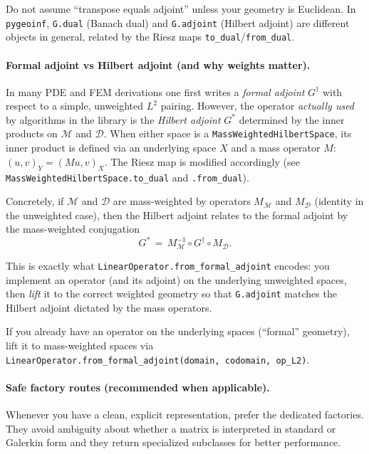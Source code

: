 \documentclass[11pt,twoside,openright]{book}
\theoremstyle{plain}
\theoremstyle{definition}
\theoremstyle{remark}
\newcommand{\modelspace}{\mathcal{M}}
\newcommand{\dataspace}{\mathcal{D}}
\newcommand{\ip}[3]{(#1,#2)_{#3}}         %
\begin{document}
\begin{pitfallbox}
Do not assume ``transpose equals adjoint'' unless your geometry is Euclidean.
In \texttt{pygeoinf}, \texttt{G.dual} (Banach dual) and \texttt{G.adjoint}
(Hilbert adjoint) are different objects in general, related by the Riesz maps
\texttt{to\_dual}/\texttt{from\_dual}.
\end{pitfallbox}

\paragraph{Formal adjoint vs Hilbert adjoint (and why weights matter).}
In many PDE and FEM derivations one first writes a \emph{formal adjoint}
$G^{\dagger}$ with respect to a simple, unweighted $L^2$ pairing. However, the
operator \emph{actually used} by algorithms in the library is the \emph{Hilbert
adjoint} $G^*$ determined by the inner products on $\modelspace$ and
$\dataspace$.
When either space is a \texttt{MassWeightedHilbertSpace}, its inner
product is defined via an underlying space $X$ and a mass operator $M$:
\(\ip{u}{v}{Y}=\ip{M u}{v}{X}\). The Riesz map is modified accordingly (see
\texttt{MassWeightedHilbertSpace.to\_dual} and \texttt{.from\_dual}).

Concretely, if $\modelspace$ and $\dataspace$ are mass-weighted by operators
$M_{\modelspace}$ and $M_{\dataspace}$ (identity in the unweighted case), then
the Hilbert adjoint relates to the formal adjoint by the mass-weighted
conjugation
\begin{equation}
  \label{eq:formal-vs-hilbert-adjoint}
  G^* \,=\, M_{\modelspace}^{-1} \circ G^{\dagger} \circ M_{\dataspace}.
\end{equation}

This is exactly what \texttt{LinearOperator.from\_formal\_adjoint} encodes: you
implement an operator (and its adjoint) on the underlying unweighted spaces,
then \emph{lift} it to the correct weighted geometry so that
\texttt{G.adjoint} matches the Hilbert adjoint dictated by the mass operators.

\begin{codebox}
If you already have an operator on the underlying spaces (``formal'' geometry),
lift it to mass-weighted spaces via
\texttt{LinearOperator.from\_formal\_adjoint(domain, codomain, op\_L2)}.
\end{codebox}

\paragraph{Safe factory routes (recommended when applicable).}
Whenever you have a clean, explicit representation, prefer the dedicated
factories. They avoid ambiguity about whether a matrix is interpreted in
standard or Galerkin form and they return specialized subclasses for better
performance.
\end{document}
